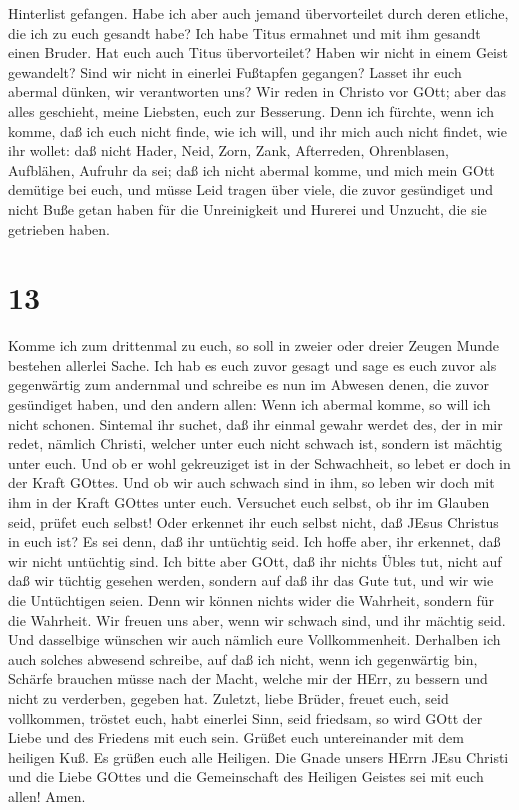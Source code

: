 Hinterlist gefangen.  Habe ich aber auch jemand
übervorteilet durch deren etliche, die ich zu euch gesandt habe?
 Ich habe Titus ermahnet und mit ihm gesandt einen Bruder.
Hat euch auch Titus übervorteilet? Haben wir nicht in einem Geist
gewandelt? Sind wir nicht in einerlei Fußtapfen gegangen? 
Lasset ihr euch abermal dünken, wir verantworten uns? Wir reden in
Christo vor GOtt; aber das alles geschieht, meine Liebsten, euch zur
Besserung.  Denn ich fürchte, wenn ich komme, daß ich euch
nicht finde, wie ich will, und ihr mich auch nicht findet, wie ihr
wollet: daß nicht Hader, Neid, Zorn, Zank, Afterreden, Ohrenblasen,
Aufblähen, Aufruhr da sei;  daß ich nicht abermal komme,
und mich mein GOtt demütige bei euch, und müsse Leid tragen über viele,
die zuvor gesündiget und nicht Buße getan haben für die Unreinigkeit und
Hurerei und Unzucht, die sie getrieben haben.

\hypertarget{section-12}{%
\section{13}\label{section-12}}

 Komme ich zum drittenmal zu euch, so soll in zweier oder
dreier Zeugen Munde bestehen allerlei Sache.  Ich hab es
euch zuvor gesagt und sage es euch zuvor als gegenwärtig zum andernmal
und schreibe es nun im Abwesen denen, die zuvor gesündiget haben, und
den andern allen: Wenn ich abermal komme, so will ich nicht schonen.
 Sintemal ihr suchet, daß ihr einmal gewahr werdet des, der
in mir redet, nämlich Christi, welcher unter euch nicht schwach ist,
sondern ist mächtig unter euch.  Und ob er wohl gekreuziget
ist in der Schwachheit, so lebet er doch in der Kraft GOttes. Und ob wir
auch schwach sind in ihm, so leben wir doch mit ihm in der Kraft GOttes
unter euch.  Versuchet euch selbst, ob ihr im Glauben seid,
prüfet euch selbst! Oder erkennet ihr euch selbst nicht, daß JEsus
Christus in euch ist? Es sei denn, daß ihr untüchtig seid. 
Ich hoffe aber, ihr erkennet, daß wir nicht untüchtig sind. 
Ich bitte aber GOtt, daß ihr nichts Übles tut, nicht auf daß wir tüchtig
gesehen werden, sondern auf daß ihr das Gute tut, und wir wie die
Untüchtigen seien.  Denn wir können nichts wider die
Wahrheit, sondern für die Wahrheit.  Wir freuen uns aber,
wenn wir schwach sind, und ihr mächtig seid. Und dasselbige wünschen wir
auch nämlich eure Vollkommenheit.  Derhalben ich auch
solches abwesend schreibe, auf daß ich nicht, wenn ich gegenwärtig bin,
Schärfe brauchen müsse nach der Macht, welche mir der HErr, zu bessern
und nicht zu verderben, gegeben hat.  Zuletzt, liebe
Brüder, freuet euch, seid vollkommen, tröstet euch, habt einerlei Sinn,
seid friedsam, so wird GOtt der Liebe und des Friedens mit euch sein.
 Grüßet euch untereinander mit dem heiligen Kuß.
 Es grüßen euch alle Heiligen.  Die Gnade
unsers HErrn JEsu Christi und die Liebe GOttes und die Gemeinschaft des
Heiligen Geistes sei mit euch allen! Amen.
